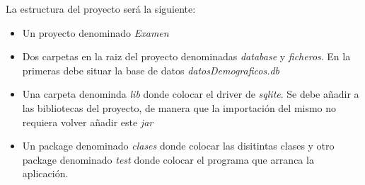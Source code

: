 \documentclass[addpoints,12pt]{exam}
\begin{document}
\begin{center}
\end{center}
\vspace{0.1in}
La estructura del proyecto será la siguiente:
\begin{itemize}
\item Un proyecto denominado \emph{Examen}
\item Dos carpetas en la raiz del proyecto denominadas \emph{database} y \emph{ficheros}. En la primeras debe situar la base de datos \emph{datosDemograficos.db}
\item Una carpeta denominda \emph{lib} donde colocar el driver de \emph{sqlite}. Se debe añadir a las bibliotecas del proyecto, de manera que la importación del mismo no requiera volver añadir este \emph{jar}
\item Un package denominado \emph{clases} donde colocar las disitintas clases y otro package denominado \emph{test} donde colocar el programa que arranca la aplicación.
\end{itemize}
\end{document}
